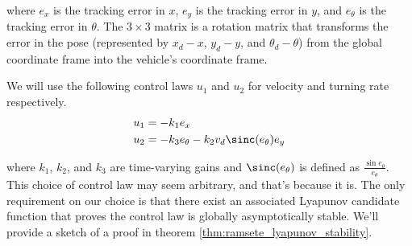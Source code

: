 where $e_x$ is the tracking \gls{error} in $x$, $e_y$ is the tracking
\gls{error} in $y$, and $e_\theta$ is the tracking \gls{error} in $\theta$.
The $3 \times 3$ matrix is a rotation matrix that transforms the \gls{error} in
the \gls{pose} (represented by $x_d - x$, $y_d - y$, and $\theta_d - \theta$)
from the global coordinate frame into the vehicle's coordinate frame.

We will use the following control laws $u_1$ and $u_2$ for velocity and turning
rate respectively.
\begin{equation}
  \begin{aligned}
    u_1 &= -k_1 e_x \\
    u_2 &= -k_3 e_\theta - k_2 v_d \sinc(e_\theta) e_y
  \end{aligned}
  \label{eq:ramsete_u}
\end{equation}

where $k_1$, $k_2$, and $k_3$ are time-varying gains and $\sinc(e_\theta)$ is
defined as $\frac{\sin{e_\theta}}{e_\theta}$. This choice of control law may
seem arbitrary, and that's because it is. The only requirement on our choice is
that there exist an associated Lyapunov candidate function that proves the
control law is globally asymptotically stable. We'll provide a sketch of a proof
in theorem \ref{thm:ramsete_lyapunov_stability}.

